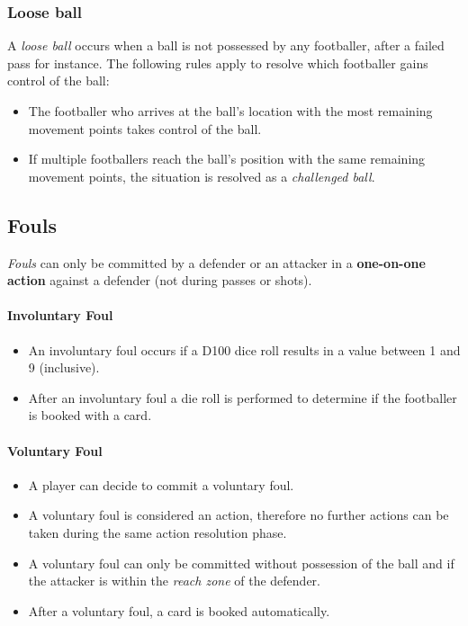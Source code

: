 \documentclass[12pt]{article}
\begin{document}
\subsubsection{\textbf{Loose} \textbf{ball}}

A \emph{loose ball} occurs when a ball is not possessed by any footballer, after a failed pass for instance. The following rules apply to resolve which footballer gains control of the ball:

\begin{rulebox}
\begin{itemize}
\item The footballer who arrives at the ball's location with the most remaining movement points takes control of the ball.
\item If multiple footballers reach the ball's position with the same remaining movement points, the situation is resolved as a \emph{challenged ball}.
\end{itemize}
\end{rulebox}

\subsection{Fouls}

\emph{Fouls} can only be committed by a defender or an attacker in a \textbf{one-on-one action} against a defender (not during passes or shots).

\paragraph{Involuntary Foul}

\begin{rulebox}
\begin{itemize}
\item An involuntary foul occurs if a D100 dice roll results in a value between 1 and 9 (inclusive).
\item After an involuntary foul a die roll is performed to determine if the footballer is booked with a card.
\end{itemize}
\end{rulebox}

\paragraph{Voluntary Foul}

\begin{rulebox}
\begin{itemize}
\item A player can decide to commit a voluntary foul.
\item A voluntary foul is considered an action, therefore no further actions can be taken during the same action resolution phase.
\item A voluntary foul can only be committed without possession of the ball and if the attacker is within the \emph{reach zone} of the defender.
\item After a voluntary foul, a card is booked automatically.
\end{itemize}
\end{rulebox}
\end{document}
